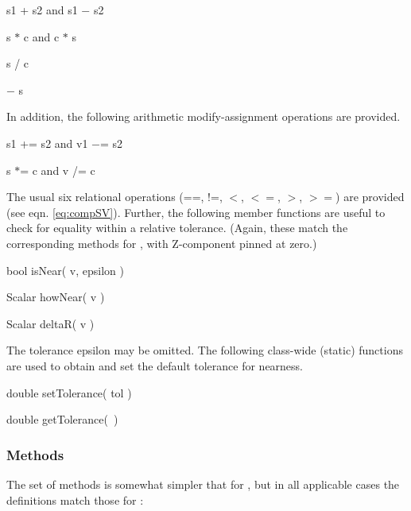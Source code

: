 \begin{shortlist}
  \item s1 + s2  and  s1 $-$ s2
  \item s $*$ c  and  c $*$ s
  \item s / c
  \item $-$ s
\end{shortlist}

\noindent
In addition, 
the following arithmetic modify-assignment operations are provided.

\begin{shortlist}
  \item s1 += s2  and  v1 $-$= s2
  \item s $*$= c  and  v /= c
\end{shortlist}

\noindent
The usual six relational operations
(==, !=, $<$, $<=$, $>$, $>=$) are provided (see eqn. \ref{eq:compSV}).
Further, the following member functions are useful to check for equality
within a relative tolerance.  (Again, these match the corresponding methods 
for \SV, with Z-component pinned at zero.)

\begin{shortlist}
  \item bool isNear( v, epsilon ) \see{\ref{eq:isNear}}
  \item Scalar howNear( v ) \see{\ref{eq:howNear}, \ref{eq:howNear:2}, \ref{eq:howNear:3}}
  \item Scalar deltaR( v ) \see{\ref{eq:deltaR}}
\end{shortlist}

\noindent
The tolerance epsilon may be omitted.
The following class-wide (static) functions are used
to obtain and set the default tolerance for nearness.

\begin{shortlist}
  \item double setTolerance( tol )	\see{\ref{eq:epsildef}}
  \item double getTolerance(~)
\end{shortlist}


\subsubsection{Methods}

The set of methods is somewhat simpler that for \SV, but in all applicable
cases the definitions match those for \SV:

